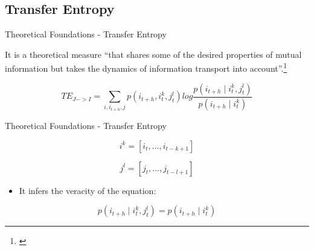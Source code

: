 \subsection{Transfer Entropy}
\begin{frame}{Theoretical Foundations - Transfer Entropy}
     \begin{definition}   
     It is a theoretical measure ``that shares some of the desired properties of mutual information but takes the dynamics of information transport into account''.\footnote{\cite{schreiber2000measuring}}
            
        \begin{equation} 
        \label{eq:trans-entropy}
        TE_{{J}->{I}} = \sum_{i,i_{t+h},j} p({i}_{t+h}, {i}_{t}^{k}, {j}_{t}^{l}) log\frac{p({i}_{t+h}\mid {i}_{t}^{k}, {j}_{t}^{l})}{p({i}_{t+h}\mid {i}_{t}^{k})}
        \end{equation} 
   \end{definition}

    
\end{frame}

\begin{frame}{Theoretical Foundations - Transfer Entropy}
        
        \begin{equation}
        \label{eq_ik}
            {i}^{k} =[{i_{t},...,{i}_{t-k+1}}] 
        \end{equation}
        
        \begin{equation}
        \label{eq_jk}
            {j}^{l}=[{j_{t},...,{j}_{t-l+1}}]
        \end{equation}

        \begin{itemize}
            \item It infers the veracity of the equation: 
        \end{itemize}

        

        \begin{equation}
            \label{eq:kullb}
                p({i}_{t+h}\mid {i}_{t}^{k}, {j}_{t}^{l}) =  p({i}_{t+h}\mid {i}_{t}^{k})
        \end{equation}
    
\end{frame}

